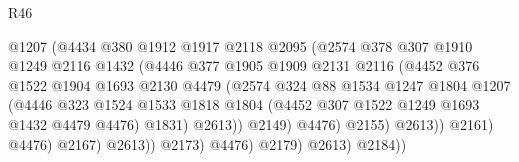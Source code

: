 \begin{lexlean}{R46}
\begin{coremodule}
                                    @1207
                                    (@4434
                                      @380
                                      @1912
                                      @1917
                                      @2118
                                      @2095
                                      (@2574
                                        @378
                                        @307
                                        @1910
                                        @1249
                                        @2116
                                        @1432
                                        (@4446
                                          @377
                                          @1905
                                          @1909
                                          @2131
                                          @2116
                                          (@4452
                                            @376
                                            @1522
                                            @1904
                                            @1693
                                            @2130
                                            @4479
                                            (@2574
                                              @324
                                              @88
                                              @1534
                                              @1247
                                              @1804
                                              @1207
                                              (@4446
                                                @323
                                                @1524
                                                @1533
                                                @1818
                                                @1804
                                                (@4452 @307 @1522 @1249 @1693 @1432 @4479 @4476)
                                                @1831)
                                              @2613))
                                          @2149)
                                        @4476)
                                      @2155)
                                    @2613))
                                @2161)
                              @4476)
                            @2167)
                          @2613))
                      @2173)
                    @4476)
                  @2179)
                @2613)
              @2184))

\end{coremodule}
\end{lexlean}
